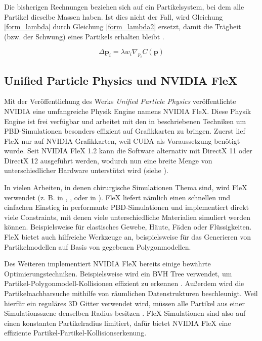 Die bisherigen Rechnungen beziehen sich auf ein Partikelsystem, bei dem alle Partikel dieselbe Massen haben. Ist dies nicht der Fall, wird Gleichung \ref{form_lambda} durch Gleichung \ref{form_lambda2} ersetzt, damit die Trägheit (bzw. der Schwung) eines Partikels erhalten bleibt \cite{PBD}.

\begin{equation}
\Delta \textbf{p}_i = \lambda w_i \nabla_{p_i} C(\textbf{p})
\label{form_lambda2}
\end{equation}

\subsection{Unified Particle Physics und NVIDIA FleX}

Mit der Veröffentlichung des Werks \textit{Unified Particle Physics} \cite{UPP} veröffentlichte NVIDIA eine umfangreiche Physik Engine namens NVIDIA FleX.  Diese Physik Engine ist frei verfügbar und arbeitet mit den in \cite{UPP} beschriebenen Techniken um PBD-Simulationen besonders effizient auf Grafikkarten zu bringen.
Zuerst lief FleX nur auf NVIDIA Grafikkarten, weil CUDA als Voraussetzung benötigt wurde. Seit NVIDIA FleX 1.2 kann die Software alternativ mit DirectX 11 oder DirectX 12 ausgeführt werden, wodurch nun eine breite Menge von unterschiedlicher Hardware unterstützt wird (siehe \cite{FlexD3D}).

In vielen Arbeiten, in denen chirurgische Simulationen Thema sind, wird FleX verwendet (z. B. in \cite{BreastBiopsy}, \cite{PBDKidney}, \cite{VRSim20} oder in \cite{VRRobSim}). FleX liefert nämlich einen schnellen und einfachen Einstieg in performante PBD-Simulationen und implementiert direkt viele Constraints, mit denen viele unterschiedliche Materialien simuliert werden können. Beispielsweise für elastisches Gewebe, Häute, Fäden oder Flüssigkeiten. FleX bietet auch hilfreiche Werkzeuge an, beispielsweise für das Generieren von Partikelmodellen auf Basis von gegebenen Polygonmodellen.

Des Weiteren implementiert NVIDIA FleX bereits einige bewährte Optimierungstechniken. Beispielsweise wird ein BVH Tree verwendet, um Partikel-Polygonmodell-Kollisionen effizient zu erkennen \cite{FlexD3D}. Außerdem wird die Partikelnachbarsuche mithilfe von räumlichen Datenstrukturen beschleunigt. Weil hierfür ein reguläres 3D Gitter verwendet wird, müssen alle Partikel aus einer Simulationsszene denselben Radius besitzen \cite{UPP}. FleX Simulationen sind also auf einen konstanten Partikelradius limitiert, dafür bietet NVIDIA FleX eine effiziente Partikel-Partikel-Kollisionserkenung.

